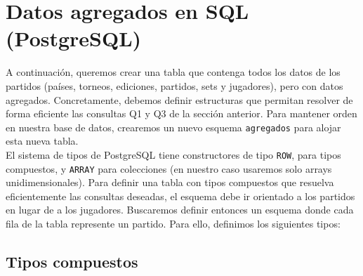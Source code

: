 \section{Datos agregados en SQL (PostgreSQL)}

A continuación, queremos crear una tabla que contenga todos los datos de los partidos (países, torneos, ediciones, partidos, sets y jugadores), pero con datos agregados. Concretamente, debemos definir estructuras que permitan resolver de forma eficiente las consultas Q1 y Q3 de la sección anterior. Para mantener orden en nuestra base de datos, crearemos un nuevo esquema \texttt{agregados} para alojar esta nueva tabla. \\

El sistema de tipos de PostgreSQL tiene constructores de tipo \texttt{ROW}, para tipos compuestos, y \texttt{ARRAY} para colecciones (en nuestro caso usaremos solo arrays unidimensionales). Para definir una tabla con tipos compuestos que resuelva eficientemente las consultas deseadas, el esquema debe ir orientado a los partidos en lugar de a los jugadores. Buscaremos definir entonces un esquema donde cada fila de la tabla represente un partido. Para ello, definimos los siguientes tipos:

\subsection{Tipos compuestos}

